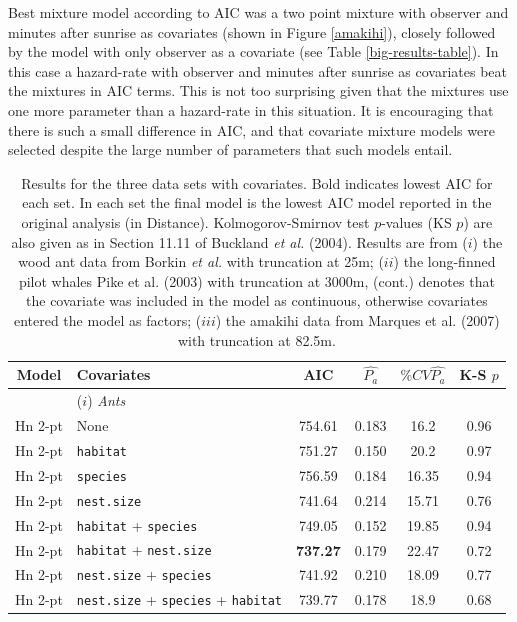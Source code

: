 \documentclass[useAMS,referee, usegraphicx]{biom}
\begin{document}
Best mixture model according to AIC was a two point mixture with observer and minutes after sunrise as covariates (shown in Figure \ref{amakihi}), closely followed by the model with only observer as a covariate (see Table \ref{big-results-table}). In this case a hazard-rate with observer and minutes after sunrise as covariates beat the mixtures in AIC terms. This is not too surprising given that the mixtures use one more parameter than a hazard-rate in this situation. It is encouraging that there is such a small difference in AIC, and that covariate mixture models were selected despite the large number of parameters that such models entail.


\begin{table}
\caption{Results for the three data sets with covariates. Bold indicates lowest AIC for each set. In each set the final model is the lowest AIC model reported in the original analysis (in Distance). Kolmogorov-Smirnov test $p$-values (KS $p$) are also given as in Section 11.11 of Buckland \textit{et al.} (2004). Results are from ($i$) the wood ant data from Borkin \textit{et al.} with truncation at 25m; ($ii$) the long-finned pilot whales Pike et al. (2003) with truncation at 3000m, (cont.) denotes that the covariate was included in the model as continuous, otherwise covariates entered the model as factors; ($iii$) the amakihi data from Marques et al. (2007) with truncation at 82.5m.}
\centering
\begin{tabular}{c l c c c c}
\hline \hline
Model & Covariates & AIC & $\hat{P_a}$ & $\% CV \hat{P_a}$ & K-S $p$\\
\hline
 & ($i$) \textit{Ants} & & & & \\
Hn 2-pt & None & 754.61 & 0.183 & 16.2 & 0.96 \\
Hn 2-pt & \texttt{habitat} & 751.27 & 0.150 & 20.2 & 0.97 \\ 
Hn 2-pt & \texttt{species} & 756.59 & 0.184 & 16.35 & 0.94 \\  
Hn 2-pt & \texttt{nest.size} & 741.64 & 0.214 & 15.71 & 0.76 \\   
Hn 2-pt & \texttt{habitat} + \texttt{species} & 749.05 & 0.152 & 19.85 & 0.94\\ 
Hn 2-pt & \texttt{habitat} + \texttt{nest.size} & \textbf{737.27} & 0.179 & 22.47 & 0.72\\
Hn 2-pt & \texttt{nest.size} + \texttt{species} & 741.92 & 0.210 & 18.09 & 0.77\\
Hn 2-pt & \texttt{nest.size} + \texttt{species} + \texttt{habitat} & 739.77 & 0.178 & 18.9 & 0.68 \\

\end{tabular}
\end{table}
\end{document}
